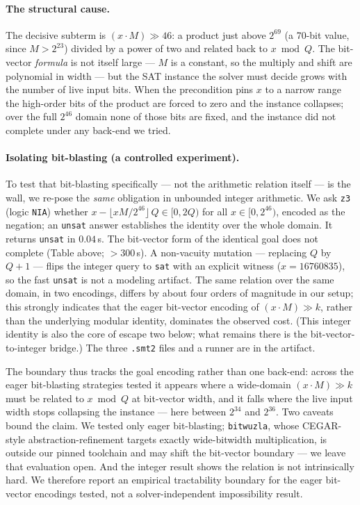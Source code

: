 \documentclass[11pt]{article}
\newcommand{\code}[1]{\texttt{#1}}
\begin{document}
\paragraph{The structural cause.} The decisive subterm is $(x \cdot M) \gg 46$: a product just above
$2^{69}$ (a 70-bit value, since $M > 2^{23}$) divided by a power of two and related back to $x \bmod Q$.
The bit-vector \emph{formula} is not
itself large --- $M$ is a constant, so the multiply and shift are polynomial in width --- but the SAT
instance the solver must decide grows with the number of live input bits. When the precondition pins $x$
to a narrow range the high-order bits of the product are forced to zero and the instance collapses; over
the full $2^{46}$ domain none of those bits are fixed, and the instance did not complete under any
back-end we tried.

\paragraph{Isolating bit-blasting (a controlled experiment).} To test that bit-blasting specifically ---
not the arithmetic relation itself --- is the wall, we re-pose the \emph{same} obligation in unbounded
integer arithmetic. We ask \code{z3} (logic \code{NIA}) whether
$x - \lfloor x M / 2^{46} \rfloor\,Q \in [0, 2Q)$ for all $x \in [0, 2^{46})$, encoded as the negation; an
\code{unsat} answer establishes the identity over the whole domain. It returns \code{unsat} in
$0.04$\,s. The bit-vector form of the identical goal does not complete (Table above; $>300$\,s). A
non-vacuity mutation --- replacing $Q$ by $Q+1$ --- flips the integer query to \code{sat} with an explicit
witness ($x = 16760835$), so the fast \code{unsat} is not a modeling artifact. The same relation over the
same domain, in two encodings, differs by about four orders of magnitude in our setup; this strongly
indicates that the eager bit-vector encoding of $(x \cdot M) \gg k$, rather than the underlying modular
identity, dominates the observed cost. (This integer identity is also the core of escape two below; what remains there
is the bit-vector-to-integer bridge.) The three \code{.smt2} files and a runner are in the artifact.

The boundary thus tracks the goal encoding rather than one back-end: across the eager bit-blasting
strategies tested it appears where a wide-domain $(x \cdot M) \gg k$ must be related to $x \bmod Q$ at
bit-vector width, and it falls where the live input width stops collapsing the instance --- here between
$2^{34}$ and $2^{36}$. Two caveats bound the claim. We tested only eager bit-blasting; \code{bitwuzla},
whose CEGAR-style abstraction-refinement targets exactly wide-bitwidth multiplication, is outside our
pinned toolchain and may shift the bit-vector boundary --- we leave that evaluation open. And the integer
result shows the relation is not intrinsically hard. We therefore report an empirical tractability
boundary for the eager bit-vector encodings tested, not a solver-independent impossibility result.
\end{document}

